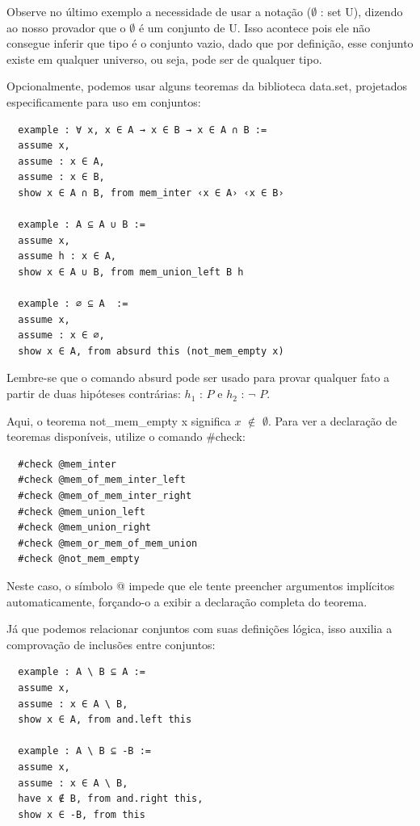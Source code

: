   Observe no último exemplo a necessidade de usar a notação { \selectfont ($\emptyset$ : set U)}, dizendo ao nosso provador que o $\emptyset$ é um conjunto de {
  \selectfont U}. Isso acontece pois ele não consegue inferir que tipo é o conjunto vazio, dado que por definição, esse conjunto existe em qualquer universo, ou seja, pode ser de qualquer tipo.

  Opcionalmente, podemos usar alguns teoremas da biblioteca {
  \selectfont data.set}, projetados especificamente para uso em conjuntos:

  \begin{lstlisting}
  example : ∀ x, x ∈ A → x ∈ B → x ∈ A ∩ B :=
  assume x,
  assume : x ∈ A,
  assume : x ∈ B,
  show x ∈ A ∩ B, from mem_inter ‹x ∈ A› ‹x ∈ B›

  example : A ⊆ A ∪ B :=
  assume x,
  assume h : x ∈ A,
  show x ∈ A ∪ B, from mem_union_left B h

  example : ∅ ⊆ A  :=
  assume x,
  assume : x ∈ ∅,
  show x ∈ A, from absurd this (not_mem_empty x) \end{lstlisting}

  Lembre-se que o comando{
  \selectfont absurd} pode ser usado para provar qualquer fato a partir de duas hipóteses contrárias: $h_1$ : $P$ e $h_2$ : $\neg$ $P$. 

  Aqui, o teorema {
  \selectfont not\_mem\_empty x} significa $x$ $\notin$ $\emptyset$. Para ver a declaração de teoremas disponíveis, utilize o comando{
  \selectfont \#check}:

  \begin{lstlisting}
  #check @mem_inter
  #check @mem_of_mem_inter_left
  #check @mem_of_mem_inter_right
  #check @mem_union_left
  #check @mem_union_right
  #check @mem_or_mem_of_mem_union
  #check @not_mem_empty \end{lstlisting}

  Neste caso, o símbolo{
  \selectfont @} impede que ele tente preencher argumentos implícitos automaticamente, forçando-o a exibir a declaração completa do teorema.

  Já que podemos relacionar conjuntos com suas definições lógica, isso auxilia a comprovação de inclusões entre conjuntos:

  \begin{lstlisting}
  example : A \ B ⊆ A :=
  assume x,
  assume : x ∈ A \ B,
  show x ∈ A, from and.left this

  example : A \ B ⊆ -B :=
  assume x,
  assume : x ∈ A \ B,
  have x ∉ B, from and.right this,
  show x ∈ -B, from this \end{lstlisting}

